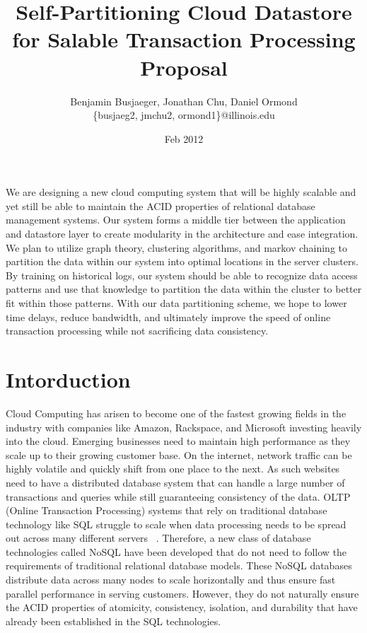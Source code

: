 \documentclass[10pt,final,journal]{IEEEtran}
\begin{document}
\title{Self-Partitioning Cloud Datastore for Salable Transaction Processing Proposal}
\author{Benjamin Busjaeger, Jonathan Chu, Daniel Ormond \\
\{busjaeg2, jmchu2, ormond1\}@illinois.edu}
\date{Feb 2012}
\maketitle



We are designing a new cloud computing system that will be highly scalable and yet still be able to maintain the ACID properties of relational database management systems. Our system forms a middle tier between the application and datastore layer to create modularity in the architecture and ease integration. We plan to utilize graph theory, clustering algorithms, and markov chaining to partition the data within our system into optimal locations in the server clusters. By training on historical logs, our system should be able to recognize data access patterns and use that knowledge to partition the data within the cluster to better fit within those patterns. With our data partitioning scheme, we hope to lower time delays, reduce bandwidth, and ultimately improve the speed of online transaction processing while not sacrificing data consistency.

\section{Intorduction}
Cloud Computing has arisen to become one of the fastest growing fields in the industry with companies like Amazon, Rackspace, and Microsoft investing heavily into the cloud. Emerging businesses need to maintain high performance as they scale up to their growing customer base. On the internet, network traffic can be highly volatile and quickly shift from one place to the next. As such websites need to have a distributed database system that can handle a large number of transactions and queries while still guaranteeing consistency of the data. OLTP (Online Transaction Processing) systems that rely on traditional database technology like SQL struggle to scale when data processing needs to be spread out across many different servers ~\cite{Malkowski:2010:EAD:1774088.1774449}. Therefore, a new class of database technologies called NoSQL have been developed that do not need to follow the requirements of traditional relational database models. These NoSQL databases distribute data across many nodes to scale horizontally and thus ensure fast parallel performance in serving customers.  However, they do not naturally ensure the ACID properties of atomicity, consistency, isolation, and durability that have already been established in the SQL technologies.
\end{document}
